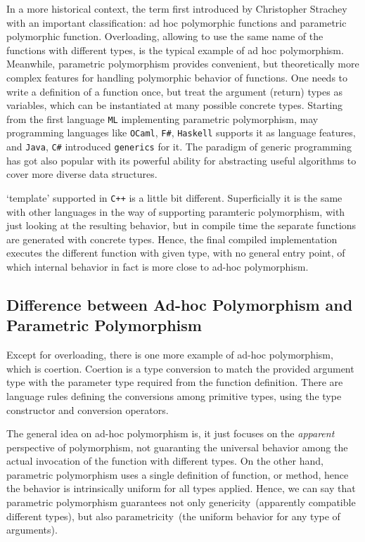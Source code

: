 \documentclass[sigconf]{acmart}
\begin{document}
In a more historical context, the term first introduced by Christopher Strachey with an important classification: ad hoc polymorphic functions and parametric polymorphic function. Overloading, allowing to use the same name of the functions with different types, is the typical example of ad hoc polymorphism. Meanwhile, parametric polymorphism provides convenient, but theoretically more complex features for handling polymorphic behavior of functions. One needs to write a definition of a function once, but treat the argument (return) types as variables, which can be instantiated at many possible concrete types. Starting from the first language \texttt{ML} implementing parametric polymorphism, may programming languages like \texttt{OCaml}, \texttt{F\#}, \texttt{Haskell} supports it as language features, and \texttt{Java}, \texttt{C\#} introduced \texttt{generics} for it. The paradigm of generic programming has got also popular with its powerful ability for abstracting useful algorithms to cover more diverse data structures. 

`template' supported in \texttt{C++} is a little bit different. Superficially it is the same with other languages in the way of supporting paramteric polymorphism, with just looking at the resulting behavior, but in compile time the separate functions are generated with concrete types. Hence, the final compiled implementation executes the different function with given type, with no general entry point, of which internal behavior in fact is more close to ad-hoc polymorphism.

\subsection{Difference between Ad-hoc Polymorphism and Parametric Polymorphism}

Except for overloading, there is one more example of ad-hoc polymorphism, which is coertion. Coertion is a type conversion to match the provided argument type with the parameter type required from the function definition. There are language rules defining the conversions among primitive types, using the type constructor and conversion operators.

The general idea on ad-hoc polymorphism is, it just focuses on the \textit{apparent} perspective of polymorphism, not guaranting the universal behavior among the actual invocation of the function with different types. On the other hand, parametric polymorphism uses a single definition of function, or method, hence the behavior is intrinsically uniform for all types applied. Hence, we can say that parametric polymorphism guarantees not only genericity~(apparently compatible different types), but also parametricity~(the uniform behavior for any type of arguments).
\end{document}
